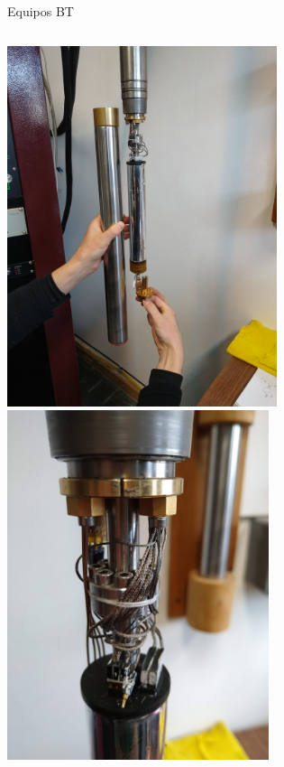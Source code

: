 \documentclass[ignorenonframetext,12pt]{beamer}
\begin{document}
\begin{frame}{Equipos BT}
				\begin{columns}
								\begin{column}{0.45\textwidth}
												\includegraphics[angle=-90,width=0.62\textwidth]{IMG_20190523_111114131} \\ 
												\includegraphics[angle=-90,width=0.6\textwidth]{IMG_20190523_105054061}
								\end{column}
								\begin{column}{0.45\textwidth}

\end{column}
\end{columns}
\end{frame}
\end{document}
